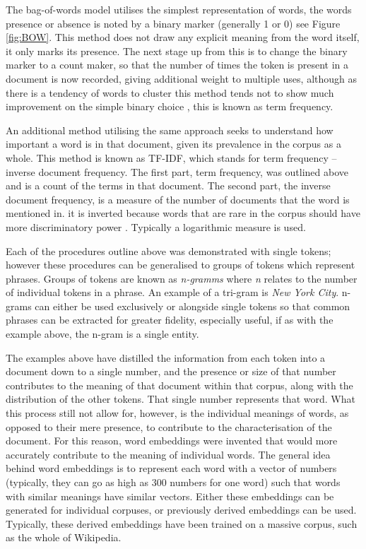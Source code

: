 The bag-of-words model utilises the simplest representation of words, the words presence or absence is noted by a binary marker (generally 1 or 0) see Figure \ref{fig:BOW}. This method does not draw any explicit meaning from the word itself, it only marks its presence. The next stage up from this is to change the binary marker to a count maker, so that the number of times the token is present in a document is now recorded, giving additional weight to multiple uses, although as there is a tendency of words to cluster this method tends not to show much improvement on the simple binary choice \parencite{eisenstein2018natural}, this is known as term frequency. 

An additional method utilising the same approach seeks to understand how important a word is in that document, given its prevalence in the corpus as a whole. This method is known as TF-IDF, which stands for term frequency – inverse document frequency. The first part, term frequency, was outlined above and is a count of the terms in that document. The second part, the inverse document frequency, is a measure of the number of documents that the word is mentioned in. it is inverted because words that are rare in the corpus should have more discriminatory power  \parencite{manning2008introduction}. Typically a logarithmic measure is used. 

Each of the procedures outline above was demonstrated with single tokens; however these procedures can be generalised to groups of tokens which represent phrases. Groups of tokens are known as \emph{n-gramms} where  \emph{n} relates to the number of individual tokens in a phrase. An example of a tri-gram is \emph{New York City}. n-grams can either be used exclusively or alongside single tokens so that common phrases can be extracted for greater fidelity, especially useful, if as with the example above, the n-gram is a single entity. 

The examples above have distilled the information from each token into a document down to a single number, and the presence or size of that number contributes to the meaning of that document within that corpus, along with the distribution of the other tokens. That single number represents that word. What this process still not allow for, however, is the individual meanings of words, as opposed to their mere presence, to contribute to the characterisation of the document. For this reason, word embeddings were invented that would more accurately contribute to the meaning of individual words. The general idea behind word embeddings is to represent each word with a vector of numbers (typically, they can go as high as 300 numbers for one word) such that words with similar meanings have similar vectors. Either these embeddings can be generated for individual corpuses, or previously derived embeddings can be used. Typically, these derived embeddings have been trained on a massive corpus, such as the whole of Wikipedia.

